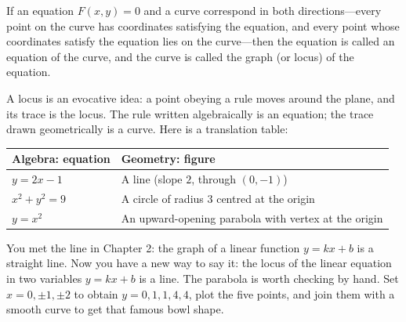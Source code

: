 \begin{dingyi}
If an equation $F(x,y)=0$ and a curve correspond in both directions---every point on the curve has coordinates satisfying the equation, and every point whose coordinates satisfy the equation lies on the curve---then the equation is called an equation of the curve, and the curve is called the graph (or locus) of the equation.
\end{dingyi}

A locus is an evocative idea: a point obeying a rule moves around the plane, and its trace is the locus. The rule written algebraically is an equation; the trace drawn geometrically is a curve. Here is a translation table:

\begin{center}
\begin{tabular}{ll}
\toprule
Algebra: equation & Geometry: figure \\
\midrule
$y=2x-1$ & A line (slope $2$, through $(0,-1)$) \\
$x^{2}+y^{2}=9$ & A circle of radius $3$ centred at the origin \\
$y=x^{2}$ & An upward-opening parabola with vertex at the origin \\
\bottomrule
\end{tabular}
\end{center}

You met the line in Chapter 2: the graph of a linear function $y=kx+b$ is a straight line. Now you have a new way to say it: the locus of the linear equation in two variables $y=kx+b$ is a line. The parabola is worth checking by hand. Set $x=0,\pm1,\pm2$ to obtain $y=0,1,1,4,4$, plot the five points, and join them with a smooth curve to get that famous bowl shape.

\begin{center}
\hspace{8mm}
\end{center}

